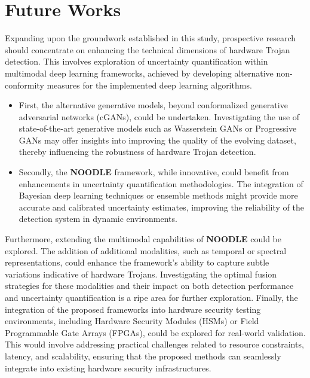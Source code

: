\section*{Future Works}

Expanding upon the groundwork established in this study, prospective research should concentrate on enhancing the technical dimensions of hardware Trojan detection. This involves exploration of uncertainty quantification within multimodal deep learning frameworks, achieved by developing alternative non-conformity measures for the implemented deep learning algorithms. 

\begin{itemize}

\item First, the alternative generative models, beyond conformalized generative adversarial networks (cGANs), could be undertaken. Investigating the use of state-of-the-art generative models such as Wasserstein GANs or Progressive GANs may offer insights into improving the quality of the evolving dataset, thereby influencing the robustness of hardware Trojan detection.

\item Secondly, the \textbf{NOODLE} framework, while innovative, could benefit from enhancements in uncertainty quantification methodologies. The integration of Bayesian deep learning techniques or ensemble methods might provide more accurate and calibrated uncertainty estimates, improving the reliability of the detection system in dynamic environments.
\end{itemize}

Furthermore, extending the multimodal capabilities of \textbf{NOODLE} could be explored. The addition of additional modalities, such as temporal or spectral representations, could enhance the framework's ability to capture subtle variations indicative of hardware Trojans. Investigating the optimal fusion strategies for these modalities and their impact on both detection performance and uncertainty quantification is a ripe area for further exploration. Finally, the integration of the proposed frameworks into hardware security testing environments, including Hardware Security Modules (HSMs) or Field Programmable Gate Arrays (FPGAs), could be explored for real-world validation. This would involve addressing practical challenges related to resource constraints, latency, and scalability, ensuring that the proposed methods can seamlessly integrate into existing hardware security infrastructures.

\endgroup